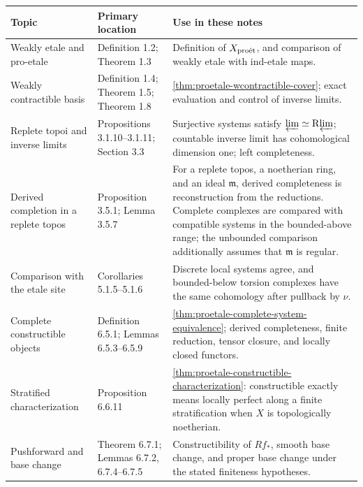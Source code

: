 \begin{longtable}{
 >{\raggedright\arraybackslash}p{}
 >{\raggedright\arraybackslash}p{}
 >{\raggedright\arraybackslash}p{}}
\toprule
Topic & Primary location & Use in these notes\\
\midrule
\endhead
Weakly etale and pro-etale &
Definition 1.2; Theorem 1.3 &
Definition of \(X_{\mathrm{pro\acute et}}\), and comparison of weakly etale with
ind-etale maps.\\

Weakly contractible basis &
Definition 1.4; Theorem 1.5; Theorem 1.8 &
\cref{thm:proetale-wcontractible-cover}; exact evaluation and control of
inverse limits.\\

Replete topoi and inverse limits &
Propositions 3.1.10--3.1.11; Section 3.3 &
Surjective systems satisfy
\(\varprojlim\simeq\mathrm R\!\varprojlim\); countable inverse limit has cohomological
dimension one; left completeness.\\

Derived completion in a replete topos &
Proposition 3.5.1; Lemma 3.5.7 &
For a replete topos, a noetherian ring, and an ideal \(\mathfrak m\), derived
completeness is reconstruction from the reductions.  Complete complexes are
compared with compatible systems in the bounded-above range; the unbounded
comparison additionally assumes that \(\mathfrak m\) is regular.\\

Comparison with the etale site &
Corollaries 5.1.5--5.1.6 &
Discrete local systems agree, and bounded-below torsion complexes have the
same cohomology after pullback by \(\nu\).\\

Complete constructible objects &
Definition 6.5.1; Lemmas 6.5.3--6.5.9 &
\cref{thm:proetale-complete-system-equivalence}; derived completeness,
finite reduction, tensor closure, and locally closed functors.\\

Stratified characterization &
Proposition 6.6.11 &
\cref{thm:proetale-constructible-characterization}: constructible exactly
means locally perfect along a finite stratification when \(X\) is
topologically noetherian.\\

Pushforward and base change &
Theorem 6.7.1; Lemmas 6.7.2, 6.7.4--6.7.5 &
Constructibility of \(Rf_*\), smooth base change, and proper base change
under the stated finiteness hypotheses.\\


\end{longtable}
